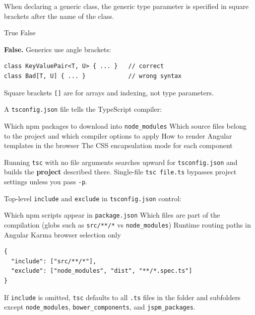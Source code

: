 \question[4]
When declaring a generic class, the generic type parameter is specified in square brackets after the name of the class.
\begin{choices}
  \choice True
  \CorrectChoice False
\end{choices}
\begin{solution}
  \textbf{False.} Generics use angle brackets:
\begin{lstlisting}[style=ts]
class KeyValuePair<T, U> { ... }   // correct
class Bad[T, U] { ... }            // wrong syntax
\end{lstlisting}
  Square brackets \lstinline[style=tsinline]{[]} are for arrays and indexing, not type parameters.
\end{solution}

\question[4]
A \texttt{tsconfig.json} file tells the TypeScript compiler:
\begin{choices}
  \choice Which npm packages to download into \texttt{node\_modules}
  \CorrectChoice Which source files belong to the project and which compiler options to apply
  \choice How to render Angular templates in the browser
  \choice The CSS encapsulation mode for each component
\end{choices}
\begin{solution}
  Running \texttt{tsc} with no file arguments searches upward for \texttt{tsconfig.json} and builds the \textbf{project} described there. Single-file \texttt{tsc file.ts} bypasses project settings unless you pass \texttt{-p}.
\end{solution}

\question[4]
Top-level \texttt{include} and \texttt{exclude} in \texttt{tsconfig.json} control:
\begin{choices}
  \choice Which npm scripts appear in \texttt{package.json}
  \CorrectChoice Which files are part of the compilation (globs such as \texttt{src/**/*} vs \texttt{node\_modules})
  \choice Runtime routing paths in Angular
  \choice Karma browser selection only
\end{choices}
\begin{solution}
\begin{lstlisting}[style=json]
{
  "include": ["src/**/*"],
  "exclude": ["node_modules", "dist", "**/*.spec.ts"]
}
\end{lstlisting}
  If \texttt{include} is omitted, \texttt{tsc} defaults to all \texttt{.ts} files in the folder and subfolders except \texttt{node\_modules}, \texttt{bower\_components}, and \texttt{jspm\_packages}.
\end{solution}

